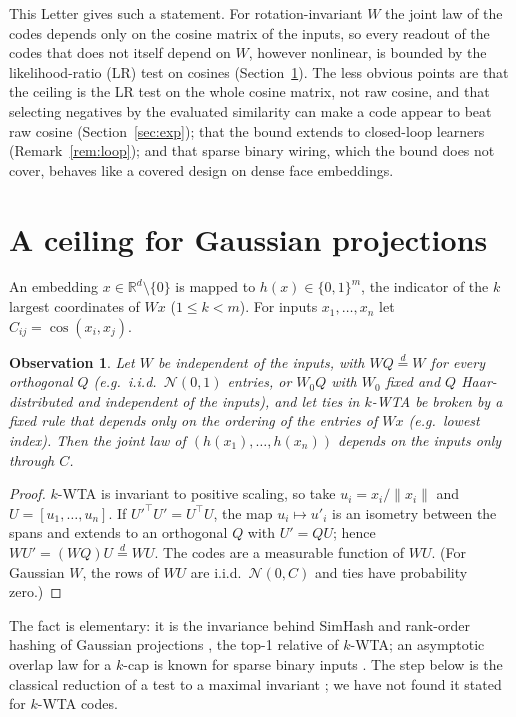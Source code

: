 \documentclass[preprint,12pt,authoryear]{elsarticle}
\newtheorem{observation}{Observation}
\theoremstyle{remark}
\newcommand{\R}{\mathbb{R}}
\begin{document}
This Letter gives such a statement. For rotation-invariant $W$ the joint law of the codes depends only on the
cosine matrix of the inputs, so every readout of the codes that does not itself depend on $W$, however
nonlinear, is bounded by the likelihood-ratio (LR) test on cosines (Section~\ref{sec:theory}). The less obvious
points are that the ceiling is the LR test on the whole cosine matrix, not raw cosine, and that selecting
negatives by the evaluated similarity can make a code appear to beat raw cosine (Section~\ref{sec:exp}); that the
bound extends to closed-loop learners (Remark~\ref{rem:loop}); and that sparse binary wiring, which the bound does
not cover, behaves like a covered design on dense face embeddings.

\section{A ceiling for Gaussian projections}\label{sec:theory}
An embedding $x\in\R^d\setminus\{0\}$ is mapped to $h(x)\in\{0,1\}^m$, the indicator of the $k$ largest
coordinates of $Wx$ ($1\le k<m$). For inputs $x_1,\dots,x_n$ let $C_{ij}=\cos(x_i,x_j)$.

\begin{observation}\label{obs:1}
Let $W$ be independent of the inputs, with $WQ\overset{d}{=}W$ for every orthogonal $Q$ (e.g.\ i.i.d.\
$\mathcal N(0,1)$ entries, or $W_0Q$ with $W_0$ fixed and $Q$ Haar-distributed and independent of the inputs),
and let ties in $k$-WTA be broken by a fixed rule that depends only on the ordering of the entries of $Wx$ (e.g.\ lowest index).
Then the joint law of $(h(x_1),\dots,h(x_n))$ depends on the inputs only through $C$.
\end{observation}
\begin{proof}
$k$-WTA is invariant to positive scaling, so take $u_i=x_i/\|x_i\|$ and $U=[u_1,\dots,u_n]$. If
$U'^{\top}U'=U^\top U$, the map $u_i\mapsto u'_i$ is an isometry between the spans and extends to an orthogonal
$Q$ with $U'=QU$; hence $WU'=(WQ)U\overset{d}{=}WU$. The codes are a measurable function of $WU$. (For Gaussian
$W$, the rows of $WU$ are i.i.d.\ $\mathcal N(0,C)$ and ties have probability zero.)
\end{proof}

The fact is elementary: it is the invariance behind SimHash \citep{charikar2002} and rank-order hashing of
Gaussian projections \citep{eshghi2008}, the top-1 relative of
$k$-WTA; an asymptotic overlap law for a $k$-cap is known for sparse binary inputs \citep{papadimitriou2019}.
The step below is the classical reduction of a test to a maximal invariant \citep{lehmann2022}; we have not
found it stated for $k$-WTA codes.
\end{document}
